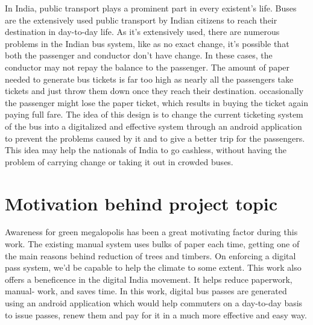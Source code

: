 In India, public transport plays a prominent part in every existent’s life. Buses are the extensively used public transport by Indian citizens to reach their destination in day-to-day life. As it's extensively used, there are numerous problems in the Indian bus system, like as no exact change, it's possible that both the passenger and conductor don't have change. In these cases, the conductor may not repay the balance to the passenger. The amount of paper needed to generate bus tickets is far too high as nearly all the passengers take tickets and just throw them down once they reach their destination. occasionally the passenger might lose the paper ticket, which results in buying the ticket again paying full fare.
The idea of this design is to change the current ticketing system of the bus into a digitalized and effective system through an android application to prevent the problems caused by it and to give a better trip for the passengers. This idea may help the nationals of India to go cashless, without having the problem of carrying change or taking it out in crowded buses.

\section{ Motivation behind project topic}
Awareness for green megalopolis has been a great motivating factor during this work. The existing manual system uses bulks of paper each time, getting one of the main reasons behind reduction of trees and timbers. On enforcing a digital pass system, we'd be capable to help the climate to some extent. This work also offers a beneficence in the digital India movement. It helps reduce paperwork, manual- work, and saves time. In this work, digital bus passes are generated using an android application which would help commuters on a day-to-day basis to issue passes, renew them and pay for it in a much more effective and easy way.
